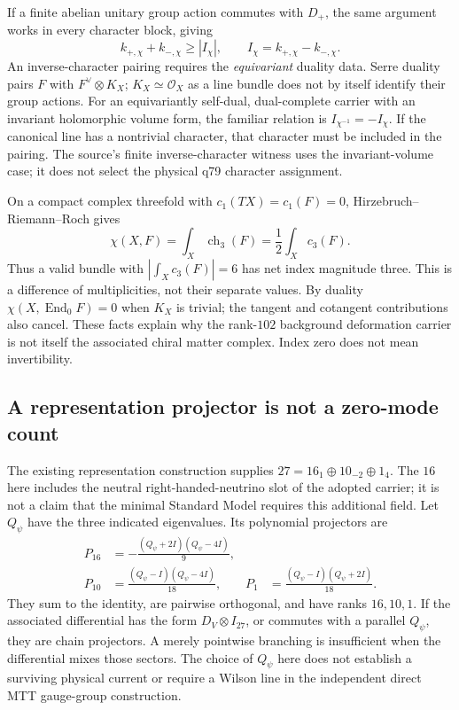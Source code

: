 \documentclass[11pt,a4paper]{article}
\begin{document}
If a finite abelian unitary group action commutes with \(D_+\), the same argument works
in every character block, giving
\[
 k_{+,\chi}+k_{-,\chi}\geq |I_\chi|,
 \qquad I_\chi=k_{+,\chi}-k_{-,\chi}.
\]
An inverse-character pairing requires the \emph{equivariant} duality
data. Serre duality pairs \(F\) with \(F^\vee\otimes K_X\);
\(K_X\simeq\mathcal O_X\) as a line bundle does not by itself identify
their group actions. For an equivariantly self-dual, dual-complete carrier
with an invariant holomorphic volume form, the familiar relation is
\(I_{\chi^{-1}}=-I_\chi\). If the canonical line has a nontrivial
character, that character must be included in the pairing. The source's
finite inverse-character witness uses the invariant-volume case; it does
not select the physical q79 character assignment.

On a compact complex threefold with \(c_1(TX)=c_1(F)=0\),
Hirzebruch--Riemann--Roch gives
\[
 \chi(X,F)=\int_X\operatorname{ch}_3(F)
          =\frac12\int_Xc_3(F).
\]
Thus a valid bundle with \(|\int_Xc_3(F)|=6\) has net index magnitude
three. This is a difference of multiplicities, not their separate values.
By duality \(\chi(X,\operatorname{End}_0F)=0\) when \(K_X\) is trivial;
the tangent and cotangent contributions also cancel. These facts explain
why the rank-\(102\) background deformation carrier is not itself the
associated chiral matter complex. Index zero does not mean invertibility.

\subsection{A representation projector is not a zero-mode count}
\label{sec:matter-projector-lift}

The existing representation construction supplies
\(27=16_1\oplus10_{-2}\oplus1_4\). The \(16\) here includes the neutral
right-handed-neutrino slot of the adopted carrier; it is not a claim that
the minimal Standard Model requires this additional field. Let \(Q_\psi\)
have the three indicated eigenvalues. Its polynomial projectors are
\begin{align*}
 P_{16}&=-\frac{(Q_\psi+2I)(Q_\psi-4I)}9,\\
 P_{10}&=\frac{(Q_\psi-I)(Q_\psi-4I)}{18},&
 P_1&=\frac{(Q_\psi-I)(Q_\psi+2I)}{18}.
\end{align*}
They sum to the identity, are pairwise orthogonal, and have ranks
\(16,10,1\). If the associated differential has the form
\(D_V\otimes I_{27}\), or commutes with a parallel \(Q_\psi\), they are
chain projectors. A merely pointwise branching is insufficient when
the differential mixes those sectors. The choice of \(Q_\psi\) here
does not establish a surviving physical current or require a Wilson
line in the independent direct MTT gauge-group construction.
\end{document}
